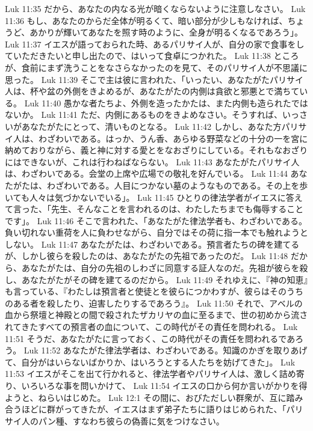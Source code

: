 Luk 11:35  だから、あなたの内なる光が暗くならないように注意しなさい。
Luk 11:36  もし、あなたのからだ全体が明るくて、暗い部分が少しもなければ、ちょうど、あかりが輝いてあなたを照す時のように、全身が明るくなるであろう」。
Luk 11:37  イエスが語っておられた時、あるパリサイ人が、自分の家で食事をしていただきたいと申し出たので、はいって食卓につかれた。
Luk 11:38  ところが、食前にまず洗うことをなさらなかったのを見て、そのパリサイ人が不思議に思った。
Luk 11:39  そこで主は彼に言われた、「いったい、あなたがたパリサイ人は、杯や盆の外側をきよめるが、あなたがたの内側は貪欲と邪悪とで満ちている。
Luk 11:40  愚かな者たちよ、外側を造ったかたは、また内側も造られたではないか。
Luk 11:41  ただ、内側にあるものをきよめなさい。そうすれば、いっさいがあなたがたにとって、清いものとなる。
Luk 11:42  しかし、あなた方パリサイ人は、わざわいである。はっか、うん香、あらゆる野菜などの十分の一を宮に納めておりながら、義と神に対する愛とをなおざりにしている。それもなおざりにはできないが、これは行わねばならない。
Luk 11:43  あなたがたパリサイ人は、わざわいである。会堂の上席や広場での敬礼を好んでいる。
Luk 11:44  あなたがたは、わざわいである。人目につかない墓のようなものである。その上を歩いても人々は気づかないでいる」。
Luk 11:45  ひとりの律法学者がイエスに答えて言った、「先生、そんなことを言われるのは、わたしたちまでも侮辱することです」。
Luk 11:46  そこで言われた、「あなたがた律法学者も、わざわいである。負い切れない重荷を人に負わせながら、自分ではその荷に指一本でも触れようとしない。
Luk 11:47  あなたがたは、わざわいである。預言者たちの碑を建てるが、しかし彼らを殺したのは、あなたがたの先祖であったのだ。
Luk 11:48  だから、あなたがたは、自分の先祖のしわざに同意する証人なのだ。先祖が彼らを殺し、あなたがたがその碑を建てるのだから。
Luk 11:49  それゆえに、『神の知恵』も言っている、『わたしは預言者と使徒とを彼らにつかわすが、彼らはそのうちのある者を殺したり、迫害したりするであろう』。
Luk 11:50  それで、アベルの血から祭壇と神殿との間で殺されたザカリヤの血に至るまで、世の初めから流されてきたすべての預言者の血について、この時代がその責任を問われる。
Luk 11:51  そうだ、あなたがたに言っておく、この時代がその責任を問われるであろう。
Luk 11:52  あなたがた律法学者は、わざわいである。知識のかぎを取りあげて、自分がはいらないばかりか、はいろうとする人たちを妨げてきた」。
Luk 11:53  イエスがそこを出て行かれると、律法学者やパリサイ人は、激しく詰め寄り、いろいろな事を問いかけて、
Luk 11:54  イエスの口から何か言いがかりを得ようと、ねらいはじめた。
Luk 12:1  その間に、おびただしい群衆が、互に踏み合うほどに群がってきたが、イエスはまず弟子たちに語りはじめられた、「パリサイ人のパン種、すなわち彼らの偽善に気をつけなさい。
